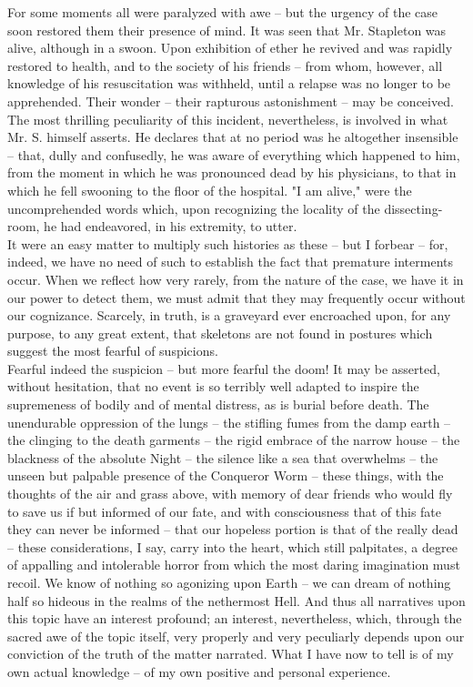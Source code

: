 \documentclass[12pt,a4paper]{article}
\begin{document}
For some moments all were paralyzed with awe -- but the urgency of the case soon restored them their presence of mind. It was seen that Mr. Stapleton was alive, although in a swoon. Upon exhibition of ether he revived and was rapidly restored to health, and to the society of his friends -- from whom, however, all knowledge of his resuscitation was withheld, until a relapse was no longer to be apprehended. Their wonder -- their rapturous astonishment -- may be conceived. \\

The most thrilling peculiarity of this incident, nevertheless, is involved in what Mr. S. himself asserts. He declares that at no period was he altogether insensible -- that, dully and confusedly, he was aware of everything which happened to him, from the moment in which he was pronounced dead by his physicians, to that in which he fell swooning to the floor of the hospital. "I am alive," were the uncomprehended words which, upon recognizing the locality of the dissecting-room, he had endeavored, in his extremity, to utter. \\

It were an easy matter to multiply such histories as these -- but I forbear -- for, indeed, we have no need of such to establish the fact that premature interments occur. When we reflect how very rarely, from the nature of the case, we have it in our power to detect them, we must admit that they may frequently occur without our cognizance. Scarcely, in truth, is a graveyard ever encroached upon, for any purpose, to any great extent, that skeletons are not found in postures which suggest the most fearful of suspicions. \\

Fearful indeed the suspicion -- but more fearful the doom! It may be asserted, without hesitation, that no event is so terribly well adapted to inspire the supremeness of bodily and of mental distress, as is burial before death. The unendurable oppression of the lungs -- the stifling fumes from the damp earth -- the clinging to the death garments -- the rigid embrace of the narrow house -- the blackness of the absolute Night -- the silence like a sea that overwhelms -- the unseen but palpable presence of the Conqueror Worm -- these things, with the thoughts of the air and grass above, with memory of dear friends who would fly to save us if but informed of our fate, and with consciousness that of this fate they can never be informed -- that our hopeless portion is that of the really dead -- these considerations, I say, carry into the heart, which still palpitates, a degree of appalling and intolerable horror from which the most daring imagination must recoil. We know of nothing so agonizing upon Earth -- we can dream of nothing half so hideous in the realms of the nethermost Hell. And thus all narratives upon this topic have an interest profound; an interest, nevertheless, which, through the sacred awe of the topic itself, very properly and very peculiarly depends upon our conviction of the truth of the matter narrated. What I have now to tell is of my own actual knowledge -- of my own positive and personal experience. \\
\end{document}
